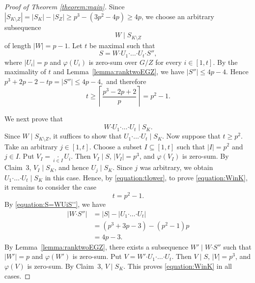 \documentclass[a4paper, 12pt]{article}
\theoremstyle{definition}
\begin{document}
\begin{proof}[Proof of Theorem \ref{theorem:main}]
Since
$|S_{K\setminus Z}| = |S_K|-|S_Z| \ge p^3-(3p^2-4p) \ge 4p$, we choose an  arbitrary subsequence
$$W\mid S_{K\setminus Z}$$ of length $|W|=p-1$.
Let $t$ be maximal such that
\begin{equation}\label{equation:S=WUiS''}
S= W\boldsymbol{\cdot} U_1\boldsymbol{\cdot}\ldots\boldsymbol{\cdot}U_t \boldsymbol{\cdot}S'',
\end{equation}
where $|U_i|=p$ and $\varphi(U_i)$ is zero-sum over $G/Z$ for every
$i\in[1,t]$. By the maximality of $t$ and
Lemma~\ref{lemma:ranktwoEGZ}, we have
$|S''|\le4p-4.$ Hence
$p^3+2p-2-tp=|S''|\leq4p-4,$
and therefore
\begin{equation}\label{equation:tlower}
t\ge
\left\lceil\frac{p^3-2p+2}{p}\right\rceil
=p^2-1.
\end{equation}




We next prove that
\begin{equation}\label{equation:WinK}
W\boldsymbol{\cdot}U_1\boldsymbol{\cdot}\ldots
\boldsymbol{\cdot}U_t\mid S_K.
\end{equation}
Since $W\mid S_{K\setminus Z}$, it suffices to show that $U_1\boldsymbol{\cdot}\ldots
\boldsymbol{\cdot}U_t\mid S_K$. Now suppose that $t\ge p^2$. Take an arbitrary $j\in[1,t]$. Choose a subset
$I\subseteq[1,t]$ such that $|I|=p^2$ and $j\in I$. Put
$V_I=
\mathop{\boldsymbol{\cdot}}\limits_{i\in I}U_i.$
Then $V_I\mid S$, $|V_I|=p^3$, and $\varphi(V_I)$ is zero-sum.
By Claim~3, $V_I\mid S_K$, and hence $U_j\mid S_K$. Since $j$ was
arbitrary, we obtain
$U_1\boldsymbol{\cdot}\ldots\boldsymbol{\cdot}U_t\mid S_K$ in this case. Hence, by \eqref{equation:tlower}, to prove \eqref{equation:WinK}, it remains to consider the case  $$t=p^2-1.$$ By
\eqref{equation:S=WUiS''}, we have
$$
\begin{aligned}
|W\boldsymbol{\cdot}S''|
&=|S|-
\left|U_1\boldsymbol{\cdot}\ldots
\boldsymbol{\cdot}U_t\right|\\
&=(p^3+3p-3)-(p^2-1)p\\
&=4p-3.
\end{aligned}
$$
By Lemma~\ref{lemma:ranktwoEGZ}, there exists a subsequence
$W'\mid W\boldsymbol{\cdot}S''$ such that $|W'|=p$ and
$\varphi(W')$ is zero-sum. Put
$V=
W'\boldsymbol{\cdot}U_1\boldsymbol{\cdot}\ldots
\boldsymbol{\cdot}U_t.$
Then $V\mid S$, $|V|=p^3$, and $\varphi(V)$ is zero-sum. By
Claim~3, $V\mid S_K$.  This proves
\eqref{equation:WinK} in all cases.



\end{proof}
\end{document}
